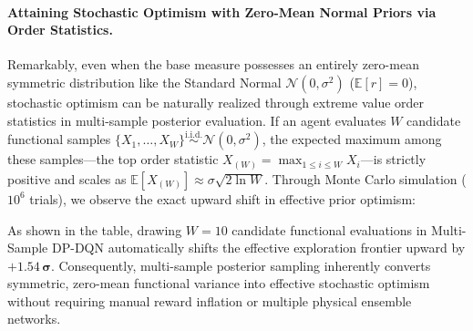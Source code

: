 \documentclass[10pt]{article}
\begin{document}
\paragraph{Attaining Stochastic Optimism with Zero-Mean Normal Priors via Order Statistics.}
Remarkably, even when the base measure possesses an entirely zero-mean symmetric distribution like the Standard Normal $\mathcal{N}(0, \sigma^2)$ ($\mathbb{E}[r]=0$), stochastic optimism can be naturally realized through extreme value order statistics in multi-sample posterior evaluation. If an agent evaluates $W$ candidate functional samples $\{X_1, \dots, X_W\} \stackrel{\text{i.i.d.}}{\sim} \mathcal{N}(0, \sigma^2)$, the expected maximum among these samples—the top order statistic $X_{(W)} = \max_{1 \le i \le W} X_i$—is strictly positive and scales as $\mathbb{E}[X_{(W)}] \approx \sigma \sqrt{2 \ln W}$. Through Monte Carlo simulation ($10^6$ trials), we observe the exact upward shift in effective prior optimism:
\begin{center}
\small
{}
\end{center}
As shown in the table, drawing $W=10$ candidate functional evaluations in Multi-Sample DP-DQN automatically shifts the effective exploration frontier upward by $\mathbf{+1.54\,\sigma}$. Consequently, multi-sample posterior sampling inherently converts symmetric, zero-mean functional variance into effective stochastic optimism without requiring manual reward inflation or multiple physical ensemble networks.
\end{document}
